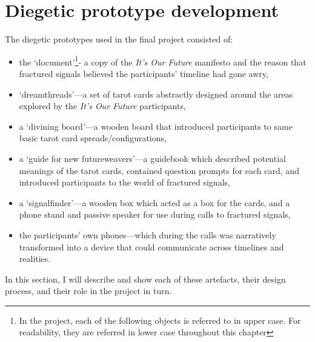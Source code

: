 \section{Diegetic prototype development}
\label{sec:8-4-fractured}
The diegetic prototypes used in the final project consisted of:
\begin{itemize}
    \item the `document'\footnote{In the project, each of the following objects is referred to in upper case. For readability, they are referred in lower case throughout this chapter}- a copy of the \emph{It's Our Future} manifesto and the reason that fractured signals believed the participants' timeline had gone awry,
    \item `dreamthreads'—a set of tarot cards abstractly designed around the areas explored by the \emph{It's Our Future} participants,
    \item a `divining board'—a wooden board that introduced participants to same basic tarot card spreads/configurations,
    \item a `guide for new futureweavers'—a guidebook which described potential meanings of the tarot cards, contained question prompts for each card, and introduced participants to the world of fractured signals,
    \item a `signalfinder'—a wooden box which acted as a box for the cards, and a phone stand and passive speaker for use during calls to fractured signals,
    \item the participants' own phones—which during the calls was narratively transformed into a device that could communicate across timelines and realities. 
\end{itemize}
In this section, I will describe and show each of these artefacts, their design process, and their role in the project in turn. 

